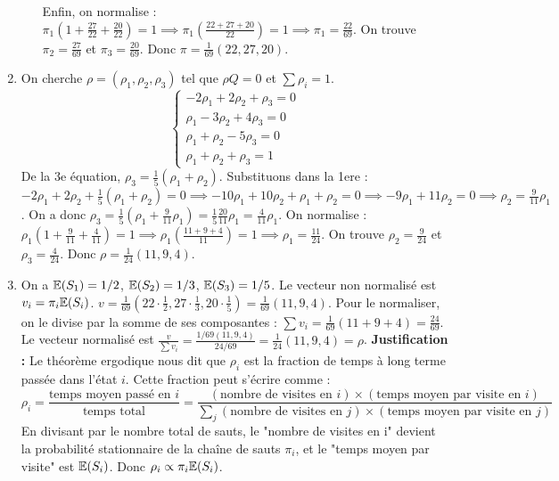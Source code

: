 \documentclass[]{exercices}
\begin{document}
\begin{solution}
\begin{enumerate}
\begin{enumerate}
        Enfin, on normalise : $\pi_1(1 + \frac{27}{22} + \frac{20}{22}) = 1 \implies \pi_1(\frac{22+27+20}{22})=1 \implies \pi_1 = \frac{22}{69}$.
        On trouve $\pi_2 = \frac{27}{69}$ et $\pi_3 = \frac{20}{69}$. Donc $\pi = \frac{1}{69}(22, 27, 20)$.
    \end{enumerate}
    \item On cherche $\rho = (\rho_1, \rho_2, \rho_3)$ tel que $\rho Q = 0$ et $\sum \rho_i=1$.
    \[ \begin{cases} -2\rho_1 + 2\rho_2 + \rho_3 = 0 \\ \rho_1 - 3\rho_2 + 4\rho_3 = 0 \\ \rho_1 + \rho_2 - 5\rho_3 = 0 \\ \rho_1+\rho_2+\rho_3=1 \end{cases} \]
    De la 3e équation, $\rho_3 = \frac{1}{5}(\rho_1+\rho_2)$. Substituons dans la 1ere : $-2\rho_1+2\rho_2+\frac{1}{5}(\rho_1+\rho_2)=0 \implies -10\rho_1+10\rho_2+\rho_1+\rho_2=0 \implies -9\rho_1+11\rho_2=0 \implies \rho_2 = \frac{9}{11}\rho_1$.
    On a donc $\rho_3 = \frac{1}{5}(\rho_1 + \frac{9}{11}\rho_1) = \frac{1}{5}\frac{20}{11}\rho_1 = \frac{4}{11}\rho_1$.
    On normalise : $\rho_1(1 + \frac{9}{11} + \frac{4}{11}) = 1 \implies \rho_1(\frac{11+9+4}{11}) = 1 \implies \rho_1 = \frac{11}{24}$.
    On trouve $\rho_2 = \frac{9}{24}$ et $\rho_3 = \frac{4}{24}$. Donc $\rho = \frac{1}{24}(11, 9, 4)$.
    \item On a $\mathbb{E}(S_1)=1/2$, $\mathbb{E}(S_2)=1/3$, $\mathbb{E}(S_3)=1/5$. Le vecteur non normalisé est $v_i = \pi_i \mathbb{E}(S_i)$.
    $v = \frac{1}{69}(22 \cdot \frac{1}{2}, 27 \cdot \frac{1}{3}, 20 \cdot \frac{1}{5}) = \frac{1}{69}(11, 9, 4)$.
    Pour le normaliser, on le divise par la somme de ses composantes : $\sum v_i = \frac{1}{69}(11+9+4) = \frac{24}{69}$.
    Le vecteur normalisé est $\frac{v}{\sum v_i} = \frac{1/69(11,9,4)}{24/69} = \frac{1}{24}(11,9,4) = \rho$.
    \textbf{Justification :} Le théorème ergodique nous dit que $\rho_i$ est la fraction de temps à long terme passée dans l'état $i$. Cette fraction peut s'écrire comme :
    \[ \rho_i = \frac{\text{temps moyen passé en } i}{\text{temps total}} = \frac{(\text{nombre de visites en } i) \times (\text{temps moyen par visite en } i)}{\sum_j (\text{nombre de visites en } j) \times (\text{temps moyen par visite en } j)} \]
    En divisant par le nombre total de sauts, le "nombre de visites en i" devient la probabilité stationnaire de la chaîne de sauts $\pi_i$, et le "temps moyen par visite" est $\mathbb{E}(S_i)$. Donc $\rho_i \propto \pi_i \mathbb{E}(S_i)$.
\end{enumerate}
\end{solution}
\end{document}
